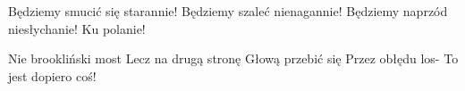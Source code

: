 \documentclass[../../../songbook.tex]{subfiles}
\begin{document}
Będziemy smucić się starannie!		  \newline	
Będziemy szaleć nienagannie! \newline	
Będziemy naprzód niesłychanie! \newline	
Ku polanie! \newline	

\-\hspace{1cm} Nie brookliński most \newline	
\-\hspace{1cm} Lecz na drugą stronę \newline	
\-\hspace{1cm} Głową przebić się \newline	
\-\hspace{1cm} Przez obłędu los- \newline	
\-\hspace{1cm} To jest dopiero coś! \newline	
\end{document}

